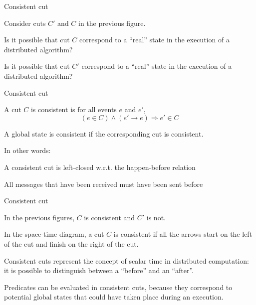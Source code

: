 \begin{frame}{Consistent cut}

Consider cuts $C'$ and $C$ in the previous figure.
\BIL
\item Is it possible that cut $C$ correspond to a ``real'' state in the
  execution of a distributed algorithm?
\item Is it possible that cut $C'$ correspond to a ``real'' state in the
  execution of a distributed algorithm?
\EIL
\end{frame}

\begin{frame}{Consistent cut}

\begin{definition}
A cut $C$ is \alert{consistent} is for all events $e$ and $e'$,
\[
  (e \in C) \wedge (e' \rightarrow e) \Rightarrow e' \in C
\]
\end{definition}

\begin{definition}
A global state is \alert{consistent} if the corresponding cut is consistent.
\end{definition}

\medskip
In other words: 
\BI
  \item A consistent cut is left-closed w.r.t. the happen-before relation
  \item All messages that have been received must have been sent before
\EI

\end{frame}



\begin{frame}{Consistent cut}

\BI
\item In the previous figures, $C$ is consistent and $C'$ is not.
\item In the space-time diagram, a cut $C$ is consistent if all
  the arrows start on the left of the cut and finish on the right
  of the cut.
\item Consistent cuts represent the concept of scalar time in distributed
  computation: it is possible to distinguish between a ``before'' and
  an ``after''.
\item \alert{Predicates} can be evaluated in consistent cuts, because they correspond
to potential global states that could have taken place during an execution.
\EI
\end{frame}



